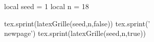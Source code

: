 \documentclass{../tex/classe-tex3R}
\begin{document}
\begin{luacode*}
  local seed = 1
  local n = 18

  tex.sprint(latexGrille(seed,n,false))
  tex.sprint('\\newpage')
  tex.sprint(latexGrille(seed,n,true))
\end{luacode*}
\end{document}
